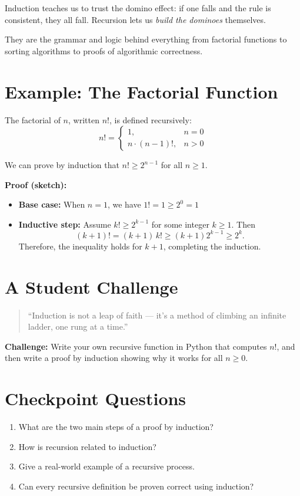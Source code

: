 Induction teaches us to trust the domino effect: if one falls and the rule is consistent, they all fall. Recursion lets us \emph{build the dominoes} themselves.

They are the grammar and logic behind everything from factorial functions to sorting algorithms to proofs of algorithmic correctness.

\section{Example: The Factorial Function}

The factorial of $n$, written $n!$, is defined recursively:
\[
  n! = 
  \begin{cases}
    1, & n = 0 \\
    n \cdot (n-1)!, & n > 0
  \end{cases}
\]

We can prove by induction that $n! \ge 2^{n-1}$ for all $n \ge 1$.

\textbf{Proof (sketch):}
\begin{itemize}
  \item \textbf{Base case:} When $n = 1$, we have $1! = 1 \ge 2^{0} = 1$\,\checkmark
  \item \textbf{Inductive step:} Assume $k! \ge 2^{k-1}$ for some integer $k \ge 1$. Then
  \[
      (k+1)! = (k+1)\,k! \ge (k+1)2^{k-1} \ge 2^{k}.
  \]
  Therefore, the inequality holds for $k + 1$, completing the induction.
\end{itemize}

\section{A Student Challenge}

\begin{quote}
“Induction is not a leap of faith — it’s a method of climbing an infinite ladder, one rung at a time.”
\end{quote}

\textbf{Challenge:} Write your own recursive function in Python that computes $n!$, and then write a proof by induction showing why it works for all $n \ge 0$.

\section{Checkpoint Questions}
\begin{enumerate}
  \item What are the two main steps of a proof by induction?
  \item How is recursion related to induction?
  \item Give a real-world example of a recursive process.
  \item Can every recursive definition be proven correct using induction?
\end{enumerate}

